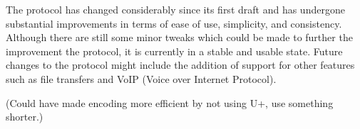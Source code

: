 The protocol has changed considerably since its first draft and has undergone substantial improvements in terms of ease of use, simplicity, and consistency. Although there are still some minor tweaks which could be made to further the improvement the protocol, it is currently in a stable and usable state. Future changes to the protocol might include the addition of support for other features such as file transfers and VoIP (Voice over Internet Protocol). %

(Could have made encoding more efficient by not using \SLASH U+, use something shorter.)
